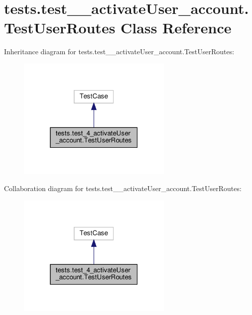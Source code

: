 \hypertarget{classtests_1_1test__4__activate_user__account_1_1_test_user_routes}{}\section{tests.\+test\+\_\+\_\+activate\+User\+\_\+account.\+Test\+User\+Routes Class Reference}
\label{classtests_1_1test__4__activate_user__account_1_1_test_user_routes}


Inheritance diagram for tests.\+test\+\_\+\_\+activate\+User\+\_\+account.\+Test\+User\+Routes\+:\nopagebreak
\begin{figure}[H]
\begin{center}
\leavevmode
\includegraphics[width=211pt]{classtests_1_1test__4__activate_user__account_1_1_test_user_routes__inherit__graph}
\end{center}
\end{figure}


Collaboration diagram for tests.\+test\+\_\+\_\+activate\+User\+\_\+account.\+Test\+User\+Routes\+:\nopagebreak
\begin{figure}[H]
\begin{center}
\leavevmode
\includegraphics[width=211pt]{classtests_1_1test__4__activate_user__account_1_1_test_user_routes__coll__graph}
\end{center}
\end{figure}
